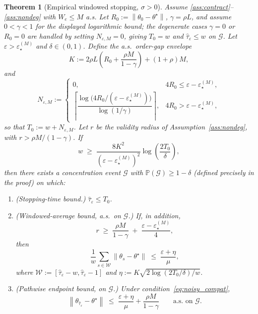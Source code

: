 \documentclass[10pt,a4paper]{amsart}
\newtheorem{theorem}{Theorem}
\newcommand{\norm}[1]{\left\lVert#1\right\rVert}
\begin{document}
\begin{theorem}[Empirical windowed stopping, $\sigma > 0$]
\label{thm:stopping_hp}
Assume \ref{ass:contract}--\ref{ass:nondeg} with $W_e \leq M$ a.s. Let
$R_0 := \norm{\theta_0 - \theta^\star}$, $\gamma = \rho L$, and assume
$0 < \gamma < 1$ for the displayed logarithmic bound; the degenerate
cases $\gamma = 0$ or $R_0 = 0$ are handled by setting $N_{\varepsilon,M}=0$,
giving $T_0 = w$ and $\hat\tau_\varepsilon \leq w$ on $\mathcal{G}$. Let
$\varepsilon > \varepsilon_\star^{(M)}$ and $\delta \in (0,1)$. Define
the a.s.\ order-gap envelope
\[
  K := 2\rho L \!\left(R_0 + \frac{\rho M}{1 - \gamma}\right) + (1+\rho)M,
\]
and
\[
N_{\varepsilon,M} :=
\begin{cases}
0, & 4R_0 \leq \varepsilon - \varepsilon_\star^{(M)},\\[4pt]
\left\lceil
  \dfrac{\log\!\bigl(4R_0/(\varepsilon-\varepsilon_\star^{(M)})\bigr)}
       {\log(1/\gamma)}
\right\rceil, & 4R_0 > \varepsilon - \varepsilon_\star^{(M)},
\end{cases}
\]
so that $T_0 := w + N_{\varepsilon,M}$.
Let $r$ be the validity radius of Assumption~\ref{ass:nondeg}, with
$r > \rho M/(1-\gamma)$.
If
\begin{equation}
\label{eq:w_condition}
w \;\geq\;
\frac{8 K^2}{(\varepsilon - \varepsilon_\star^{(M)})^2}
\log\!\left(\frac{2 T_0}{\delta}\right),
\end{equation}
then there exists a concentration event $\mathcal{G}$ with
$\mathbb{P}(\mathcal{G}) \geq 1 - \delta$ (defined precisely in the proof)
on which:
\begin{enumerate}
\item[(i)] \textnormal{(Stopping-time bound.)} $\hat\tau_\varepsilon \leq T_0$.

\item[(ii)] \textnormal{(Windowed-average bound, a.s.\ on $\mathcal{G}$.)}
If, in addition,
\begin{equation}
\label{eq:noisy_compat}
  r \;\geq\; \frac{\rho M}{1-\gamma} \;+\; \frac{\varepsilon - \varepsilon_\star^{(M)}}{4},
\end{equation}
then
\[
  \frac{1}{w}\sum_{s \in \mathcal{W}} \norm{\theta_s - \theta^\star}
  \;\leq\; \frac{\varepsilon + \eta}{\mu},
\]
where $\mathcal{W} := [\hat\tau_\varepsilon - w, \hat\tau_\varepsilon - 1]$
and $\eta := K\sqrt{2 \log(2 T_0 / \delta) / w}$.

\item[(iii)] \textnormal{(Pathwise endpoint bound, on $\mathcal{G}$.)} Under
condition~\eqref{eq:noisy_compat},
\[
  \norm{\theta_{\hat\tau_\varepsilon} - \theta^\star}
  \;\leq\; \frac{\varepsilon + \eta}{\mu} + \frac{\rho M}{1 - \gamma}
  \qquad \text{a.s.\ on } \mathcal{G}.
\]
\end{enumerate}
\end{theorem}
\end{document}
